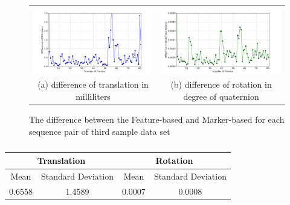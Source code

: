 \begin{figure}[H]
\begin{tabular}{cc}
  \includegraphics[width=80mm]{figures/diff_600/graph_translation} &  \includegraphics[width=80mm]{figures/diff_600/graph_rotation} \\
(a) difference of translation in milliliters & (b) difference of rotation in degree of quaternion \\[6pt]
\end{tabular}
\caption{The difference between the Feature-based and Marker-based for each sequence pair of third sample data set}\label{fig:sample_03_diff}
\end{figure}

\begin{table}[H]
\centering
  \begin{tabular}{| c | c | c | c |}
      \hline
      \multicolumn{2}{|c|}{Translation} & \multicolumn{2}{c}{Rotation} \\ \hline
       Mean & Standard Deviation & Mean & Standard Deviation \\ \hline
      0.6558 & 1.4589 & 0.0007 & 0.0008 \\ \hline
  \end{tabular}
  \caption{} \label{tab:sample_03_diff}
\end{table}

